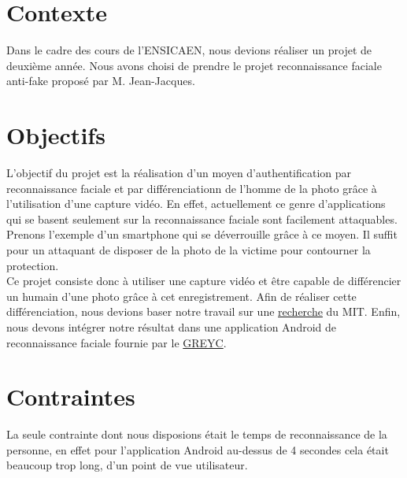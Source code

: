\section{Contexte}

Dans le cadre des cours de l'ENSICAEN, nous devions réaliser un projet de deuxième année. Nous avons choisi de prendre le projet reconnaissance faciale anti-fake proposé
par M.  Jean-Jacques. 

\section{Objectifs}

L'objectif du projet est la réalisation d'un moyen d'authentification par reconnaissance faciale et par différenciationn de l'homme de la photo  grâce à l'utilisation d'une capture vidéo. En effet, actuellement ce genre d'applications qui se basent seulement sur la reconnaissance faciale sont facilement 
attaquables. Prenons l'exemple d'un smartphone qui se déverrouille grâce à ce moyen. Il suffit pour un attaquant de disposer de la photo de la victime pour contourner la protection. \\
Ce projet consiste donc à utiliser une capture vidéo et être capable de différencier un humain d'une photo grâce à cet enregistrement. Afin de réaliser cette différenciation, nous devions baser notre travail sur une \href{http://people.csail.mit.edu/mrub/papers/vidmag.pdf}{recherche} du MIT\@. Enfin, nous devons intégrer notre résultat dans une application Android de reconnaissance faciale fournie par le \href{https://www.greyc.fr/}{GREYC}.

\section{Contraintes}

La seule contrainte dont nous disposions était le temps de reconnaissance de la personne, en effet pour l'application Android au-dessus de 4 secondes cela était beaucoup trop long, d'un point de vue 
utilisateur. 
